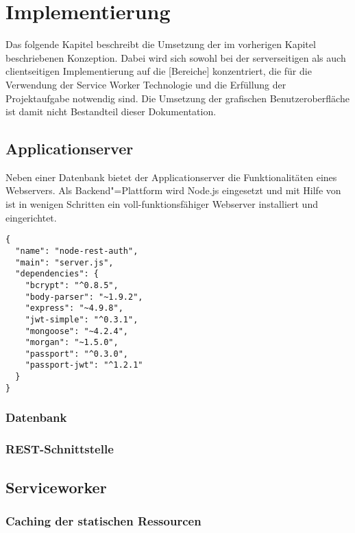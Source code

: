 \chapter{Implementierung}

Das folgende Kapitel beschreibt die Umsetzung der im vorherigen Kapitel beschriebenen Konzeption. Dabei wird sich sowohl bei der serverseitigen als auch clientseitigen Implementierung auf die [Bereiche] konzentriert, die für die Verwendung der Service Worker Technologie und die Erfüllung der Projektaufgabe notwendig sind. Die Umsetzung der grafischen Benutzeroberfläche ist damit nicht Bestandteil dieser Dokumentation.

\section{Applicationserver}

Neben einer Datenbank bietet der Applicationserver die Funktionalitäten eines Webservers. Als Backend"=Plattform wird Node.js eingesetzt und mit Hilfe von  ist in wenigen Schritten ein voll-funktionsfähiger Webserver installiert und eingerichtet.  

\begin{lstlisting}[caption=package.json - notwendige Node.js Pakete, frame=single]
{
  "name": "node-rest-auth",
  "main": "server.js",
  "dependencies": {
    "bcrypt": "^0.8.5",
    "body-parser": "~1.9.2",
    "express": "~4.9.8",
    "jwt-simple": "^0.3.1",
    "mongoose": "~4.2.4",
    "morgan": "~1.5.0",
    "passport": "^0.3.0",
    "passport-jwt": "^1.2.1"
  }
}
\end{lstlisting}


\subsection{Datenbank}
\label{subsec_implementierung_datenbank}

\subsection{REST-Schnittstelle}

\section{Serviceworker}

\subsection{Caching der statischen Ressourcen}

